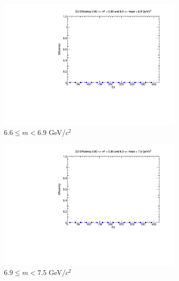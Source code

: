 \documentclass[11pt]{article}
\begin{document}
\begin{figure}[p]
\begin{subfigure}[b]{0.32\textwidth}
        \includegraphics[width=\textwidth]{./kTrackerEfficiencyPlots/D2_Efficiency_xF16_mass8.pdf}
        \caption{$6.6 \leq m < 6.9$ GeV/$c^2$}
    \end{subfigure}\vspace{0.5cm}
    \begin{subfigure}[b]{0.32\textwidth}
        \centering
        \includegraphics[width=\textwidth]{./kTrackerEfficiencyPlots/D2_Efficiency_xF16_mass9.pdf}
        \caption{$6.9 \leq m < 7.5$ GeV/$c^2$}
    \end{subfigure}\hfill
    \begin{subfigure}[b]{0.32\textwidth}
        \centering

\end{subfigure}
\end{figure}
\end{document}
